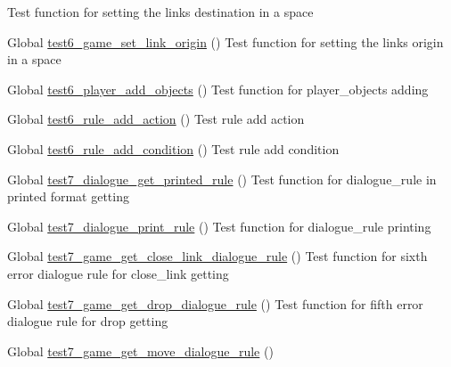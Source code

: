 \begin{DoxyRefList}
%
Test function for setting the link\textquotesingle{}s destination in a space  
\item[Global \mbox{\hyperlink{game__test_8c_a5b94841baa622b41ba1b46a5a6eda53c}{test6\+\_\+game\+\_\+set\+\_\+link\+\_\+origin}} ()]\label{test__test000248}%
%
Test function for setting the link\textquotesingle{}s origin in a space  
\item[Global \mbox{\hyperlink{player__test_8c_af7320755d63f971bef0d159d6d2f5cd3}{test6\+\_\+player\+\_\+add\+\_\+objects}} ()]\label{test__test000561}%
%
Test function for player\+\_\+objects adding  
\item[Global \mbox{\hyperlink{rule__test_8c_a1467a9e4cf16c58155aa71d7f7755d79}{test6\+\_\+rule\+\_\+add\+\_\+action}} ()]\label{test__test000630}%
%
Test rule add action  
\item[Global \mbox{\hyperlink{rule__test_8c_a8182b4917815621170e3caff125244ab}{test6\+\_\+rule\+\_\+add\+\_\+condition}} ()]\label{test__test000624}%
%
Test rule add condition  
\item[Global \mbox{\hyperlink{dialogue__test_8c_a77b136a2e465c11487ffa13d65340a9f}{test7\+\_\+dialogue\+\_\+get\+\_\+printed\+\_\+rule}} ()]\label{test__test000073}%
%
Test function for dialogue\+\_\+rule in printed format getting  
\item[Global \mbox{\hyperlink{dialogue__test_8c_ac915f413c01b6441fbb2237af8f0d935}{test7\+\_\+dialogue\+\_\+print\+\_\+rule}} ()]\label{test__test000063}%
%
Test function for dialogue\+\_\+rule printing  
\item[Global \mbox{\hyperlink{game__test_8c_a69450e7c65fdb805c9c0bbca38a6ba58}{test7\+\_\+game\+\_\+get\+\_\+close\+\_\+link\+\_\+dialogue\+\_\+rule}} ()]\label{test__test000383}%
%
Test function for sixth error dialogue rule for close\+\_\+link getting  
\item[Global \mbox{\hyperlink{game__test_8c_a35c3a8c6d785f28ca1db27ddf36e6f03}{test7\+\_\+game\+\_\+get\+\_\+drop\+\_\+dialogue\+\_\+rule}} ()]\label{test__test000350}%
%
Test function for fifth error dialogue rule for drop getting  
\item[Global \mbox{\hyperlink{game__test_8c_a853a86e70536ac699b6ad60f4896eb5d}{test7\+\_\+game\+\_\+get\+\_\+move\+\_\+dialogue\+\_\+rule}} ()]\label{test__test000330}%
%

\end{DoxyRefList}
